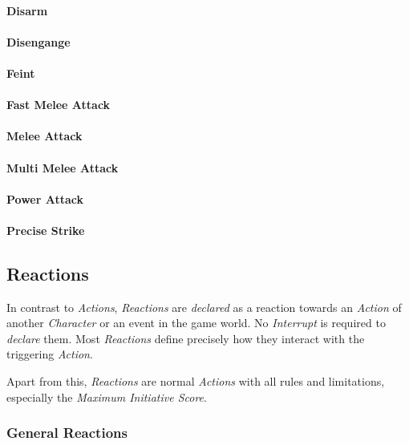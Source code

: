 \paragraph{Disarm}

\paragraph{Disengange}

\paragraph{Feint}

\paragraph{Fast Melee Attack}

\paragraph{Melee Attack}

\paragraph{Multi Melee Attack}

\paragraph{Power Attack}

\paragraph{Precise Strike}

\subsection{Reactions}

In contrast to \emph{Actions}, \emph{Reactions} are \emph{declared} as a reaction
towards an \emph{Action} of another \emph{Character} or an event in the game world.
No \emph{Interrupt} is required to \emph{declare} them. Most \emph{Reactions} define
precisely how they interact with the triggering \emph{Action}.

Apart from this, \emph{Reactions} are normal \emph{Actions} with all rules and
limitations, especially the \emph{Maximum Initiative Score}.

\subsubsection{General Reactions}

